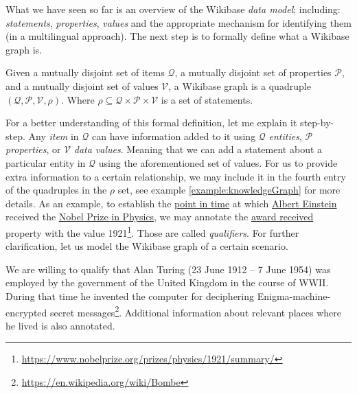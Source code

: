 What we have seen so far is an overview of the Wikibase \textit{data model}; including: \textit{statements}, \textit{properties}, \textit{values} and the appropriate mechanism for identifying them (in a multilingual approach). The next step is to formally define what a Wikibase graph is.

\begin{definition}
    Given a mutually disjoint set of items $\mathcal{Q}$, a mutually disjoint set of properties $\mathcal{P}$, and a mutually disjoint set of values $\mathcal{V}$, a Wikibase graph is a quadruple $(\mathcal{Q}, \mathcal{P}, \mathcal{V}, \rho)$. Where $\rho \subseteq \mathcal{Q} \times \mathcal{P} \times \mathcal{V}$ is a set of statements.
\end{definition}

For a better understanding of this formal definition, let me explain it step-by-step. Any \textit{item} in $\mathcal{Q}$ can have information added to it using $\mathcal{Q}$ \textit{entities}, $\mathcal{P}$ \textit{properties}, or $\mathcal{V}$ \textit{data values}. Meaning that we can add a statement about a particular entity in $\mathcal{Q}$ using the aforementioned set of values. For us to provide extra information to a certain relationship, we may include it in the fourth entry of the quadruples in the $\rho$ set, see example \ref{example:knowledgeGraph} for more details. As an example, to establish the \href{https://www.wikidata.org/wiki/Property:P585}{point in time} at which \href{https://www.wikidata.org/wiki/Q937} {Albert Einstein} received the \href{https://www.wikidata.org/wiki/Q38104}{Nobel Prize in Physics}, we may annotate the \href{https://www.wikidata.org/wiki/Property:P166}{award received} property with the value 1921\footnote{\url{https://www.nobelprize.org/prizes/physics/1921/summary/}}. Those are called \textit{qualifiers}. For further clarification, let us model the Wikibase graph of a certain scenario.

\vspace*{-0.5em}

\begin{example}
    \label{example:knowledgeGraph}
    We are willing to qualify that Alan Turing (23 June 1912 -- 7 June 1954) was employed by the government of the United Kingdom in the course of WWII. During that time he invented the computer for deciphering Enigma-machine-encrypted secret messages\footnote{\url{https://en.wikipedia.org/wiki/Bombe}}. Additional information about relevant places where he lived is also annotated.
\end{example}

